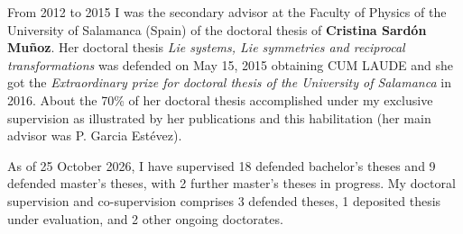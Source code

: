 \documentclass[12pt,reqno]{amsbook}
\begin{document}
From  2012 to 2015  I was the secondary advisor at the Faculty of Physics of the University of Salamanca (Spain) of the doctoral thesis of  {\bf Cristina Sard\'on Mu\~noz}. Her doctoral thesis {\it Lie systems, Lie symmetries and reciprocal transformations} was defended on May 15, 2015 obtaining CUM LAUDE and she got the {\it Extraordinary prize for doctoral thesis of the University of Salamanca} in 2016. About the 70\% of her doctoral thesis accomplished under my exclusive supervision as illustrated by her publications and this habilitation (her main advisor was P. Garcia Est\'evez).

\vskip 0.5cm

As of 25 October 2026, I have supervised 18 defended bachelor's theses and 9 defended master's theses, with 2 further master's theses in progress. My doctoral supervision and co-supervision comprises 3 defended theses, 1 deposited thesis under evaluation, and 2 other ongoing doctorates.
\end{document}
